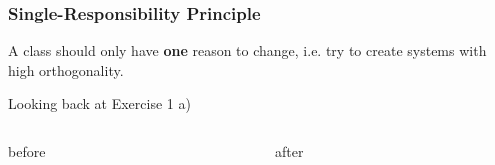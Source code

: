 \documentclass[9pt]{beamer}
\begin{document}
\begin{frame}
  \frametitle{Single-Responsibility Principle}
  \begin{theorem}
    A class should only have \textbf{one} reason to change, i.e. try to create systems with high orthogonality.
  \end{theorem}
\vfill
\pause
\begin{exampleblock}{Looking back at Exercise 1 a)}
  \begin{columns}[t]
    \begin{column}{.48\textwidth}
       \begin{block}{before}

          \begin{center}
          \end{center}
       \end{block}
    \end{column}
\hfill
    \begin{column}{.48\textwidth}
       \begin{block}{after}
       \begin{center}
       \end{center}
      \end{block}
    \end{column}
  \end{columns}
\end{exampleblock}
\end{frame}
\end{document}
